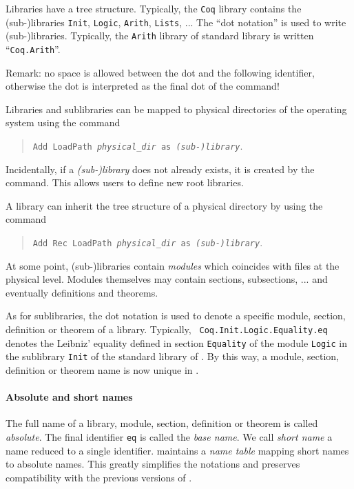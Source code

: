 \documentclass[11pt]{article}
\begin{document}
Libraries have a tree structure. Typically, the {\tt Coq} library
contains the (sub-)libraries {\tt Init}, {\tt Logic}, {\tt Arith},
{\tt Lists}, ... The ``dot notation'' is used to write
(sub-)libraries. Typically, the {\tt Arith} library of {\Coq} standard
library is written ``{\tt Coq.Arith}''.

\smallskip
Remark: no space is allowed
between the dot and the following identifier, otherwise the dot is
interpreted as the final dot of the command!
\smallskip

Libraries and sublibraries can be mapped to physical directories of the
operating system using the command

\begin{quote}
{\tt Add LoadPath {\it physical\_dir} as {\it (sub-)library}}.
\end{quote}

Incidentally, if a {\it (sub-)library} does not already
exists, it is created by the command. This allows users to define new
root libraries.

A library can inherit the tree structure of a physical directory by
using the command

\begin{quote}
{\tt Add Rec LoadPath {\it physical\_dir} as {\it (sub-)library}}.
\end{quote}

At some point, (sub-)libraries contain {\it modules} which coincides
with files at the physical level. Modules themselves may contain
sections, subsections, ... and eventually definitions and theorems.

As for sublibraries, the dot notation is used to denote a specific
module, section, definition or theorem of a library. Typically, {\tt
Coq.Init.Logic.Equality.eq} denotes the Leibniz' equality defined in
section {\tt Equality} of the module {\tt Logic} in the
sublibrary {\tt Init} of the standard library of \Coq. By
this way, a module, section, definition or theorem name is now unique
in \Coq.

\paragraph{Absolute and short names}

The full name of a library, module, section, definition or theorem is
called {\it absolute}. The final identifier {\tt eq} is called the
{\it base name}. We call {\it short name} a name reduced to a single
identifier.  {\Coq} maintains a {\it name table} mapping short names
to absolute names. This greatly simplifies the notations and preserves
compatibility with the previous versions of \Coq.
\end{document}
